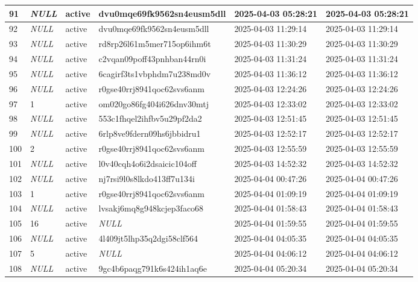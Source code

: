 \begin{longtable}{|l|l|l|l|l|l|}
91 & \textit{NULL} & active & dvu0mqe69fk9562sn4eusm5dll & 2025-04-03 05:28:21 & 2025-04-03 05:28:21 \\ \hline 
92 & \textit{NULL} & active & dvu0mqe69fk9562sn4eusm5dll & 2025-04-03 11:29:14 & 2025-04-03 11:29:14 \\ \hline 
93 & \textit{NULL} & active & rd8rp26l61m5mer715op6ihm6t & 2025-04-03 11:30:29 & 2025-04-03 11:30:29 \\ \hline 
94 & \textit{NULL} & active & c2vqan09poff43pnhban44rn0i & 2025-04-03 11:31:24 & 2025-04-03 11:31:24 \\ \hline 
95 & \textit{NULL} & active & 6cagirf3ts1vbphdm7u238md0v & 2025-04-03 11:36:12 & 2025-04-03 11:36:12 \\ \hline 
96 & \textit{NULL} & active & r0gse40rrj8941qoc62svs6anm & 2025-04-03 12:24:26 & 2025-04-03 12:24:26 \\ \hline 
97 & 1 & active & om020go86fg404i626dnv30mtj & 2025-04-03 12:33:02 & 2025-04-03 12:33:02 \\ \hline 
98 & \textit{NULL} & active & 553c1fhqel2ihfbv5u29pf2da2 & 2025-04-03 12:51:45 & 2025-04-03 12:51:45 \\ \hline 
99 & \textit{NULL} & active & 6rlp8ve9fdern09hs6jbbidru1 & 2025-04-03 12:52:17 & 2025-04-03 12:52:17 \\ \hline 
100 & 2 & active & r0gse40rrj8941qoc62svs6anm & 2025-04-03 12:55:59 & 2025-04-03 12:55:59 \\ \hline 
101 & \textit{NULL} & active & l0v40cqh4o6i2dsaicic104off & 2025-04-03 14:52:32 & 2025-04-03 14:52:32 \\ \hline 
102 & \textit{NULL} & active & nj7rsi9l0s8lkdo413ff7u134i & 2025-04-04 00:47:26 & 2025-04-04 00:47:26 \\ \hline 
103 & 1 & active & r0gse40rrj8941qoc62svs6anm & 2025-04-04 01:09:19 & 2025-04-04 01:09:19 \\ \hline 
104 & \textit{NULL} & active & lvsakj6mq8g948kcjep3faco68 & 2025-04-04 01:58:43 & 2025-04-04 01:58:43 \\ \hline 
105 & 16 & active & \textit{NULL} & 2025-04-04 01:59:55 & 2025-04-04 01:59:55 \\ \hline 
106 & \textit{NULL} & active & 4l409jt5lhp35q2dgi58clf564 & 2025-04-04 04:05:35 & 2025-04-04 04:05:35 \\ \hline 
107 & 5 & active & \textit{NULL} & 2025-04-04 04:06:12 & 2025-04-04 04:06:12 \\ \hline 
108 & \textit{NULL} & active & 9gc4b6paqg791k6s424ih1aq6e & 2025-04-04 05:20:34 & 2025-04-04 05:20:34 \\ \hline 

\end{longtable}
